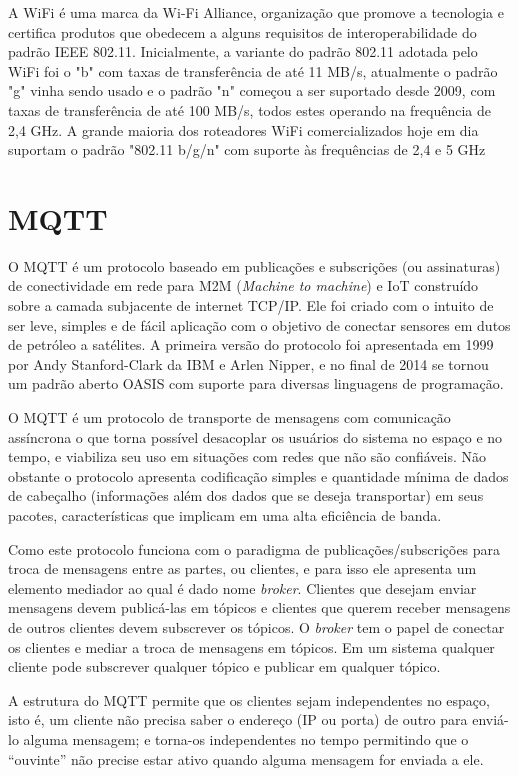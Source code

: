 A \acf{WiFi} é uma marca da Wi-Fi Alliance, organização que promove a tecnologia e certifica produtos que obedecem a alguns requisitos de interoperabilidade do padrão \ac{IEEE} 802.11. Inicialmente, a variante do padrão 802.11 adotada pelo WiFi foi o "b" com taxas de transferência de até 11 MB/s, atualmente o padrão "g" vinha sendo usado e o padrão "n" começou a ser suportado desde 2009, com taxas de transferência de até 100 MB/s, todos estes operando na frequência de 2,4 GHz. A grande maioria dos roteadores WiFi comercializados hoje em dia suportam o padrão "802.11 b/g/n" com suporte às frequências de 2,4 e 5 GHz 

\section{\ac{MQTT}}

O \acf{MQTT} é um protocolo baseado em publicações e subscrições (ou assinaturas) de conectividade em rede para M2M (\textit{Machine to machine}) e \ac{IoT} construído sobre a camada subjacente de internet \ac{TCP}/\ac{IP}. Ele foi criado com o intuito de ser leve, simples e de fácil aplicação com o objetivo de conectar sensores em dutos de petróleo a satélites. A primeira versão do protocolo foi apresentada em 1999 por Andy Stanford-Clark da IBM e Arlen Nipper, e no final de 2014 se tornou um padrão aberto OASIS \cite{oasis} com suporte para diversas linguagens de programação.

O MQTT é um protocolo de transporte de mensagens com comunicação assíncrona o que torna possível desacoplar os usuários do sistema no espaço e no tempo, e viabiliza seu uso em situações com redes que não são confiáveis. Não obstante o protocolo apresenta codificação simples e quantidade mínima de dados de cabeçalho (informações além dos dados que se deseja transportar) em seus pacotes, características que implicam em uma alta eficiência de banda.

Como este protocolo funciona com o paradigma de publicações/subscrições para troca de mensagens entre as partes, ou clientes, e para isso ele apresenta um elemento mediador ao qual é dado nome \textit{broker}. Clientes que desejam enviar mensagens devem publicá-las em tópicos e clientes que querem receber mensagens de outros clientes devem subscrever os tópicos. O \textit{broker} tem o papel de conectar os clientes e mediar a troca de mensagens em tópicos. Em um sistema qualquer cliente pode subscrever qualquer tópico e publicar em qualquer tópico.

A estrutura do MQTT permite que os clientes sejam independentes no espaço, isto é, um cliente não precisa saber o endereço (IP ou porta) de outro para enviá-lo alguma mensagem; e torna-os independentes no tempo permitindo que o “ouvinte” não precise estar ativo quando alguma mensagem for enviada a ele.

